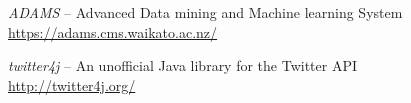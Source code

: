 %

\begin{thebibliography}{999}

		\textit{ADAMS} -- Advanced Data mining and Machine learning System \\
		\url{https://adams.cms.waikato.ac.nz/}{}
		
		\textit{twitter4j} -- An unofficial Java library for the Twitter API \\
		\url{http://twitter4j.org/}{}

\end{thebibliography}
